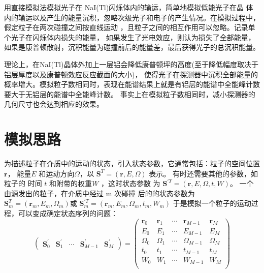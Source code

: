 \documentclass{article}
\begin{document}
用直接模拟法模拟光子在 NaI(Tl)闪烁体内的输运，简单地模拟低能光子在晶
体内的输运以及产生的能量沉积，忽略次级光子和电子的产生情况。在模拟过程中，假定粒子在两次碰撞之间按直线运动 ，且粒子之间的相互作用可以忽略。记录单个光子在闪烁体内损失的能量，
如果发生了光电效应，则认为损失了全部能量，如果是康普顿散射，沉积能量为碰撞前后的能量差，最后获得光子的总沉积能量。


理论上，在NaI(Tl)晶体外加上一层铝会降低康普顿坪的高度(至于降低幅度取决于铝层厚度以及康普顿效应反应截面的大小)，
使得光子在探测器中沉积全部能量的概率增大。模拟粒子数相同时，表现在能谱结果上就是有铝层的能谱中全能峰计数要大于无铝层的能谱中全能峰计数。
事实上在模拟粒子数相同时，减小探测器的几何尺寸也会达到相应的效果。

\section{模拟思路}
为描述粒子在介质中的运动的状态，引入状态参数，它通常包括：粒子的空间位置
$\boldsymbol{r}$， 能量$E$ 和运动方向$ \boldsymbol{\varOmega} $，以 $\boldsymbol{S}^T=(\boldsymbol{r},E,\boldsymbol{\varOmega} )$ 表示。
有时还需要其他的参数，如粒子的 时间 $t$ 和附带的权重$W$ ，这时状态参数 为 $\boldsymbol{S}^{'T}=( \boldsymbol{r} , E , \boldsymbol{\varOmega}   ,t , W )$。
一个由源发出的粒子，在介质中经过 m 次碰撞
后的的状态参数为$\boldsymbol{S}^T_m=(\boldsymbol{r}_m,E_m,\boldsymbol{\varOmega}_m )$或 $\boldsymbol{S}^{'T}_m=( \boldsymbol{r}_m , E_m , \boldsymbol{\varOmega} _m  ,t _m, W_m )$
于是模拟一个粒子的运动过程，可以变成确定状态序列的问题：
\begin{equation}
    \begin{pmatrix}
        \boldsymbol{S}^{'}_0 & \boldsymbol{S}^{'}_1 & \cdots & \boldsymbol{S}^{'}_{M - 1} & \boldsymbol{S}^{'}_M 
    \end{pmatrix}
    =
    \begin{pmatrix}
    \boldsymbol{r}_0 & \boldsymbol{r}_1 & \cdots & \boldsymbol{r}_{M - 1} & \boldsymbol{r}_M \\
    E_0 & E_1 & \cdots & E_{M - 1} & E_M \\
    \boldsymbol{\varOmega} _0 & \boldsymbol{\varOmega} _1 & \cdots & \boldsymbol{\varOmega} _{M - 1} & \boldsymbol{\varOmega} _M\\
    t_0 & t_1 & \cdots & t_{M - 1} & t_M \\
    W_0 & W_1 & \cdots & W_{M - 1} & W_M \\ 
    \end{pmatrix}
\end{equation}
\end{document}
